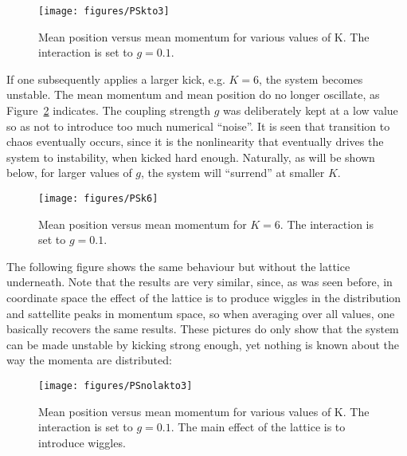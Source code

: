 \begin{figure}[H]
\begin{center}
\texttt{[image: figures/PSkto3]}
\caption{Mean position versus mean momentum for various values of K. The interaction is set to $g=0.1$.}
\label{fig:PSkto3}
\end{center}
\end{figure}

If one subsequently applies a larger kick, e.g. $K=6$, the system becomes unstable. The mean momentum and mean position do no longer oscillate, as Figure~\ref{fig:PSk6} indicates. The coupling strength $g$ was deliberately kept at a low value so as not to introduce too much numerical ``noise''. It is seen that transition to chaos eventually occurs, since it is the nonlinearity that eventually drives the system to instability, when kicked hard enough. Naturally, as will be shown below, for larger values of $g$, the system will ``surrend'' at smaller $K$. 

\begin{figure}[H]
\begin{center}
\texttt{[image: figures/PSk6]}
\caption{Mean position versus mean momentum for  $K=6$. The interaction is set to $g=0.1$.}
\label{fig:PSk6}
\end{center}
\end{figure}

The following figure shows the same behaviour but without the lattice underneath. Note that the results are very similar, since, as was seen before, in coordinate space the effect of the lattice is to 
produce wiggles in the distribution and sattellite peaks in momentum space, so when averaging over all values, one basically recovers the same results. These pictures do only show that the system can be made unstable by kicking strong enough, yet nothing is known about the way the momenta are distributed:

\begin{figure}[H]
\begin{center}
\texttt{[image: figures/PSnolakto3]}
\caption{Mean position versus mean momentum for various values of K. The interaction is set to $g=0.1$. The main effect of the lattice is to introduce wiggles.}
\label{fig:PSnolakto3}
\end{center}
\end{figure}

